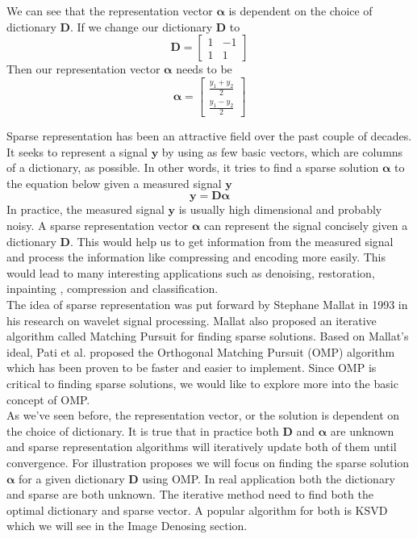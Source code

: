 \documentclass[12pt,letterpaper]{article}
\begin{document}
We can see that the representation vector $\bm{\alpha}$ is dependent on the choice of dictionary $\bm{D}$. If we change our dictionary $\bm{D}$ to 
\[
\bm{D}=\begin{bmatrix} 
1 & -1 \\
1 & 1 
\end{bmatrix}
\]
Then our representation vector $\bm{\alpha}$ needs to be 
\[
\bm{\alpha}=\begin{bmatrix} 
\frac{y_1+y_2}{2} \\
\frac{y_1-y_2}{2}
\end{bmatrix}
\]

Sparse representation has been an attractive field over the past couple of decades. It seeks to represent a signal $\bm{y}$ by using as few basic vectors, which are columns of a dictionary, as possible. In other words, it tries to find a sparse solution $\bm{\alpha}$ to the equation below given a measured signal $\bm{y}$
\[
    \bm{y} = \bm{D}\bm{\alpha} 
\]
In practice, the measured signal $\bm{y}$ is usually high dimensional and probably noisy. A sparse representation vector $\bm{\alpha}$ can represent the signal concisely given a dictionary $\bm{D}$. This would help us to get information from the measured signal and process the information like compressing and encoding more easily. This would lead to many interesting applications such as  denoising\cite{EladAharon2006}, restoration, inpainting \cite{ShenHu2009}, compression and classification. 
\\

The idea of sparse representation was put forward by Stephane Mallat \cite{Mallat1993} in 1993 in his research on wavelet signal processing. Mallat also proposed an iterative algorithm called Matching Pursuit for finding sparse solutions. Based on Mallat's ideal, Pati et al. proposed the Orthogonal Matching Pursuit (OMP) algorithm which has been proven to be faster and easier to implement\cite{TroppGilbert2007}. Since OMP is critical to finding sparse solutions, we would like to explore more into the basic concept of OMP.
\\

As we've seen before, the representation vector, or the solution is dependent on the choice of dictionary. It is true that in practice both $\bm{D}$ and $\bm{\alpha}$ are unknown and sparse representation algorithms will iteratively update both of them until convergence. For illustration proposes we will focus on finding the sparse solution $\bm{\alpha}$ for a given dictionary $\bm{D}$ using OMP. In real application both the dictionary and sparse are both unknown. The iterative method need to find both the optimal dictionary and sparse vector. A popular algorithm for both is KSVD \cite{EladAharonBruckstein2006} which we will see in the Image Denosing section. 
\\
\end{document}
